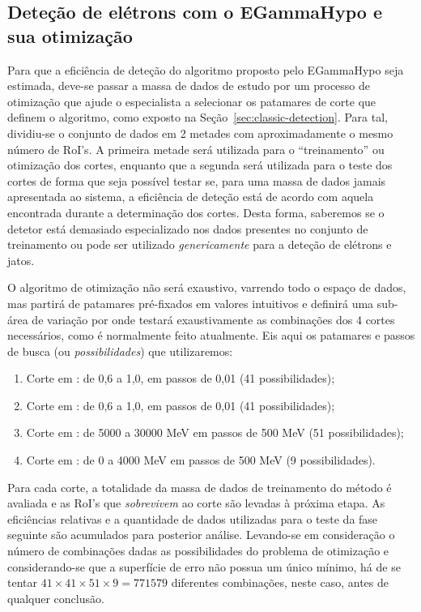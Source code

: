 \subsection{Deteção de elétrons com o EGammaHypo e sua otimização}
\label{sec:eghypo}

Para que a eficiência de deteção do algoritmo proposto pelo EGammaHypo seja
estimada, deve-se passar a massa de dados de estudo por um processo de
otimização que ajude o especialista a selecionar os patamares de corte que
definem o algoritmo, como exposto na Seção~\ref{sec:classic-detection}. Para
tal, dividiu-se o conjunto de dados em 2 metades com aproximadamente o mesmo
número de RoI's. A primeira metade será utilizada para o ``treinamento'' ou
otimização dos cortes, enquanto que a segunda será utilizada para o teste dos
cortes de forma que seja possível testar se, para uma massa de dados jamais
apresentada ao sistema, a eficiência de deteção está de acordo com aquela
encontrada durante a determinação dos cortes. Desta forma, saberemos se o
detetor está demasiado especializado nos dados presentes no conjunto de
treinamento ou pode ser utilizado \emph{genericamente} para a deteção de
elétrons e jatos.

O algoritmo de otimização não será exaustivo, varrendo todo o espaço de dados,
mas partirá de patamares pré-fixados em valores intuitivos e definirá uma
sub-área de variação por onde testará exaustivamente as combinações dos 4
cortes necessários, como é normalmente feito atualmente. Eis aqui os patamares
e passos de busca (ou \emph{possibilidades}) que utilizaremos:

\begin{enumerate}
\item Corte em \rcore: de 0,6 a 1,0, em passos de 0,01 (41 possibilidades);
\item Corte em \eratio: de 0,6 a 1,0, em passos de 0,01 (41 possibilidades);
\item Corte em \etem: de 5000 a 30000 MeV em passos de 500 MeV (51
possibilidades);
\item Corte em \ethad: de 0 a 4000 MeV em passos de 500 MeV (9
possibilidades). 
\end{enumerate}

Para cada corte, a totalidade da massa de dados de treinamento do método é
avaliada e as RoI's que \textit{sobrevivem} ao corte são levadas à próxima
etapa. As eficiências relativas e a quantidade de dados utilizadas para o
teste da fase seguinte são acumulados para posterior análise. Levando-se em
consideração o número de combinações dadas as possibilidades do problema de
otimização e considerando-se que a superfície de erro não possua um único
mínimo, há de se tentar $41 \times 41 \times 51 \times 9 = 771579$ diferentes
combinações, neste caso, antes de qualquer conclusão.

